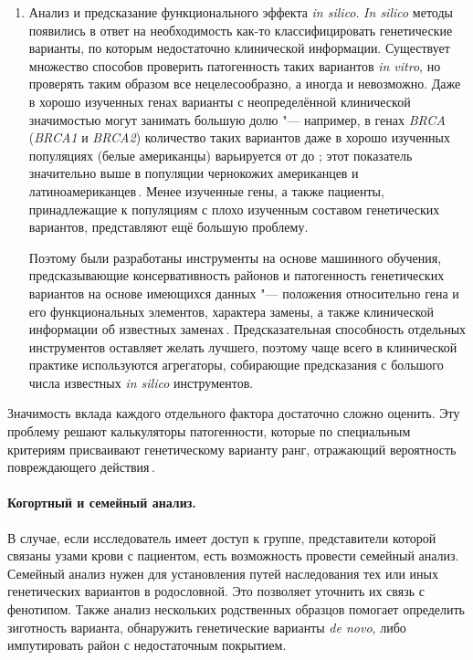 \documentclass[a4paper,14pt]{extarticle}
\newcommand{\genename}[1]{\textit{#1}}
\newcommand{\ecitep}[1]{\textenglish{\citep{#1}}}
\begin{document}
\begin{enumerate}
	\item Анализ и предсказание функционального эффекта \textit{in silico}.
	 \textit{In silico} методы появились в ответ на необходимость как-то классифицировать генетические варианты, по которым недостаточно клинической информации.
	 Существует множество способов проверить патогенность таких вариантов \textit{in vitro}, но проверять таким образом все нецелесообразно, а иногда и невозможно.
	 Даже в хорошо изученных генах варианты с неопределённой клинической значимостью могут занимать большую долю "--- например, в генах \genename{BRCA} (\genename{BRCA1} и \genename{BRCA2}) количество таких вариантов даже в хорошо изученных популяциях (белые американцы) варьируется от  до ;
	 этот показатель значительно выше в популяции чернокожих американцев и латиноамериканцев\,\ecitep{Chern_2019}.
	 Менее изученные гены, а также пациенты, принадлежащие к популяциям с плохо изученным составом генетических вариантов, представляют ещё большую проблему.

	 Поэтому были разработаны инструменты на основе машинного обучения, предсказывающие консервативность районов и патогенность генетических вариантов на основе имеющихся данных "--- положения относительно гена и его функциональных элементов, характера замены, а также клинической информации об известных заменах\,\ecitep{j_Brea_Fernandez_2011}.
	 Предсказательная способность отдельных инструментов оставляет желать лучшего, поэтому чаще всего в клинической практике используются агрегаторы, собирающие предсказания с большого числа известных \textit{in silico} инструментов.
\end{enumerate}

Значимость вклада каждого отдельного фактора достаточно сложно оценить.
Эту проблему решают калькуляторы патогенности, которые по специальным критериям присваивают генетическому варианту ранг, отражающий вероятность повреждающего действия\,\ecitep{Ryzhkova_2017}.

\paragraph{Когортный и семейный анализ.}
В случае, если исследователь имеет доступ к группе, представители которой связаны узами крови с пациентом, есть возможность провести семейный анализ.
Семейный анализ нужен для установления путей наследования тех или иных генетических вариантов в родословной.
Это позволяет уточнить их связь с фенотипом.
Также анализ нескольких родственных образцов помогает определить зиготность варианта, обнаружить генетические варианты \textit{de novo}, либо импутировать район с недостаточным покрытием.
\end{document}

